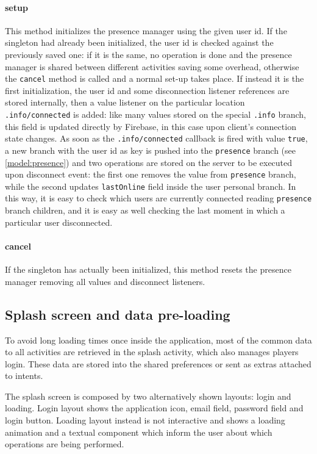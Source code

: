 			\paragraph{setup}
			This method initializes the presence manager using the given user id.
			If the singleton had already been initialized, the user id is checked against the previously saved one: if it is the same, no operation is done and the presence manager is shared between different activities saving some overhead, otherwise the \lstinline|cancel| method is called and a normal set-up takes place.
			If instead it is the first initialization, the user id and some disconnection listener references are stored internally, then a value listener on the particular location \lstinline|.info/connected| is added: like many values stored on the special \lstinline|.info| branch, this field is updated directly by Firebase, in this case upon client's connection state changes.
			As soon as the \lstinline|.info/connected| callback is fired with value \lstinline|true|, a new branch with the user id as key is pushed into the \lstinline|presence| branch (see \autoref{model:presence}) and two operations are stored on the server to be executed upon disconnect event: the first one removes the value from \lstinline|presence| branch, while the second updates \lstinline|lastOnline| field inside the user personal branch.
			In this way, it is easy to check which users are currently connected reading \lstinline|presence| branch children, and it is easy as well checking the last moment in which a particular user disconnected.
			
			\paragraph{cancel}
			If the singleton has actually been initialized, this method resets the presence manager removing all values and disconnect listeners.
		
		\subsection{Splash screen and data pre-loading}\label{focus:splash}
		
			To avoid long loading times once inside the application, most of the common data to all activities are retrieved in the splash activity, which also manages players login.
			These data are stored into the shared preferences or sent as extras attached to intents.
			
			The splash screen is composed by two alternatively shown layouts: login and loading.
			Login layout shows the application icon, email field, password field and login button.
			Loading layout instead is not interactive and shows a loading animation and a textual component which inform the user about which operations are being performed.
			
